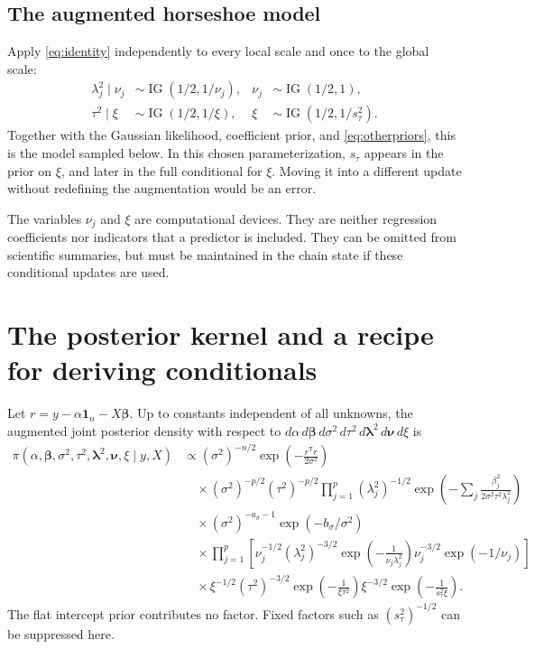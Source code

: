 \documentclass[11pt,letterpaper]{article}
\numberwithin{equation}{section}
\newcommand{\IG}{\operatorname{IG}}
\newcommand{\given}{\mid}
\newcommand{\bbeta}{\bm{\beta}}
\newcommand{\blambda}{\bm{\lambda}}
\newcommand{\bnu}{\bm{\nu}}
\newcommand{\ones}{\mathbf{1}}
\newcommand{\trans}{^{\mathsf T}}
\begin{document}
\subsection{The augmented horseshoe model}

Apply \eqref{eq:identity} independently to every local scale and once to the
global scale:
\begin{align}
 \lambda_j^2\given\nu_j&\sim\IG(1/2,1/\nu_j),
 &\nu_j&\sim\IG(1/2,1),\label{eq:localaug}\\
 \tau^2\given\xi&\sim\IG(1/2,1/\xi),
 &\xi&\sim\IG(1/2,1/s_\tau^2).\label{eq:globalaug}
\end{align}
Together with the Gaussian likelihood, coefficient prior, and
\eqref{eq:otherpriors}, this is the model sampled below. In this chosen
parameterization, \(s_\tau\) appears in the prior on \(\xi\), and later in
the full conditional for \(\xi\). Moving it into a different update without
redefining the augmentation would be an error.

The variables \(\nu_j\) and \(\xi\) are computational devices. They are
neither regression coefficients nor indicators that a predictor is included.
They can be omitted from scientific summaries, but must be maintained in the
chain state if these conditional updates are used.

\section{The posterior kernel and a recipe for deriving conditionals}\label{sec:kernel}

Let \(r=y-\alpha\ones_n-X\bbeta\). Up to constants independent of all
unknowns, the augmented joint posterior density with respect to
\(d\alpha\,d\bbeta\,d\sigma^2\,d\tau^2\,d\blambda^2\,d\bnu\,d\xi\) is
\begin{align}\label{eq:jointkernel}
 \pi(\alpha,\bbeta,\sigma^2,\tau^2,\blambda^2,\bnu,\xi\given y,X)
 &\propto
 (\sigma^2)^{-n/2}\exp\left(-\frac{r\trans r}{2\sigma^2}\right)\nonumber\\
 &\quad\times(\sigma^2)^{-p/2}(\tau^2)^{-p/2}
 \prod_{j=1}^p(\lambda_j^2)^{-1/2}
 \exp\left(-\sum_j\frac{\beta_j^2}{2\sigma^2\tau^2\lambda_j^2}\right)\nonumber\\
 &\quad\times(\sigma^2)^{-a_\sigma-1}\exp(-b_\sigma/\sigma^2)\nonumber\\
 &\quad\times\prod_{j=1}^p
 \left[\nu_j^{-1/2}(\lambda_j^2)^{-3/2}
       \exp\left(-\frac{1}{\nu_j\lambda_j^2}\right)
       \nu_j^{-3/2}\exp(-1/\nu_j)\right]\nonumber\\
 &\quad\times\xi^{-1/2}(\tau^2)^{-3/2}
       \exp\left(-\frac{1}{\xi\tau^2}\right)
       \xi^{-3/2}\exp\left(-\frac{1}{s_\tau^2\xi}\right).
\end{align}
The flat intercept prior contributes no factor. Fixed factors such as
\((s_\tau^2)^{-1/2}\) can be suppressed here.
\end{document}
